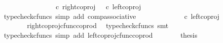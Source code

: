 \begin{isabellebody}
\ \ \ \ \ \ \ \ \ \ {\isacharparenleft}{\kern0pt}{\isasymlangle}{\isasymt}{\isacharcomma}{\kern0pt}{\isasymt}{\isasymrangle}\ {\isasymamalg}\ {\isasymlangle}{\isasymf}{\isacharcomma}{\kern0pt}\ {\isasymf}{\isasymrangle}\ {\isasymamalg}\ {\isasymlangle}{\isasymf}{\isacharcomma}{\kern0pt}{\isasymt}{\isasymrangle}\ {\isasymcirc}\isactrlsub c\ right{\isacharunderscore}{\kern0pt}coproj\ {\isasymone}\ {\isacharparenleft}{\kern0pt}{\isasymone}{\isasymCoprod}{\isasymone}{\isacharparenright}{\kern0pt}\ {\isacharparenright}{\kern0pt}{\isasymcirc}\isactrlsub c\ left{\isacharunderscore}{\kern0pt}coproj\ {\isasymone}\ {\isasymone}{\isachardoublequoteclose}\isanewline
\ \ \ \ \ \ \isamarkupfalse%
\ {\isacharparenleft}{\kern0pt}typecheck{\isacharunderscore}{\kern0pt}cfuncs{\isacharcomma}{\kern0pt}\ simp\ add{\isacharcolon}{\kern0pt}\ comp{\isacharunderscore}{\kern0pt}associative{}{\isacharparenright}{\kern0pt}\isanewline
\ \ \ \ \isamarkupfalse%
\ \isamarkupfalse%
\ {\isachardoublequoteopen}{\isachardot}{\kern0pt}{\isachardot}{\kern0pt}{\isachardot}{\kern0pt}\ {\isacharequal}{\kern0pt}\ {\isasymlangle}{\isasymf}{\isacharcomma}{\kern0pt}\ {\isasymf}{\isasymrangle}\ {\isasymamalg}\ {\isasymlangle}{\isasymf}{\isacharcomma}{\kern0pt}{\isasymt}{\isasymrangle}\ {\isasymcirc}\isactrlsub c\ left{\isacharunderscore}{\kern0pt}coproj\ {\isasymone}\ {\isasymone}{\isachardoublequoteclose}\isanewline
\ \ \ \ \ \ \isamarkupfalse%
\ right{\isacharunderscore}{\kern0pt}coproj{\isacharunderscore}{\kern0pt}cfunc{\isacharunderscore}{\kern0pt}coprod\ \isamarkupfalse%
\ {\isacharparenleft}{\kern0pt}typecheck{\isacharunderscore}{\kern0pt}cfuncs{\isacharcomma}{\kern0pt}\ smt{\isacharparenright}{\kern0pt}\isanewline
\ \ \ \ \isamarkupfalse%
\ \isamarkupfalse%
\ {\isachardoublequoteopen}{\isachardot}{\kern0pt}{\isachardot}{\kern0pt}{\isachardot}{\kern0pt}\ {\isacharequal}{\kern0pt}\ {\isasymlangle}{\isasymf}{\isacharcomma}{\kern0pt}\ {\isasymf}{\isasymrangle}{\isachardoublequoteclose}\isanewline
\ \ \ \ \ \ \isamarkupfalse%
\ {\isacharparenleft}{\kern0pt}typecheck{\isacharunderscore}{\kern0pt}cfuncs{\isacharcomma}{\kern0pt}\ simp\ add{\isacharcolon}{\kern0pt}\ left{\isacharunderscore}{\kern0pt}coproj{\isacharunderscore}{\kern0pt}cfunc{\isacharunderscore}{\kern0pt}coprod{\isacharparenright}{\kern0pt}\isanewline
\ \ \ \ \isamarkupfalse%
\ \isamarkupfalse%
\ {\isacharquery}{\kern0pt}thesis\isanewline
\ \ \ \ \ \ \isamarkupfalse%

\end{isabellebody}
